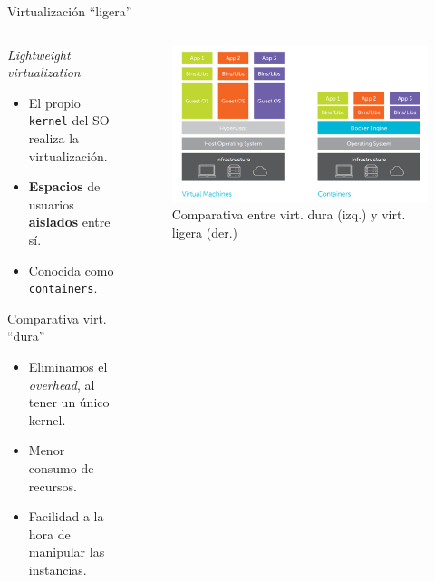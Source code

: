 \documentclass[aspectratio=169,xcolor=dvipsnames]{beamer}
\begin{document}
	\begin{frame}{Virtualización ``ligera''}
	\begin{columns}
	\begin{column}{0.4\textwidth}
	    \begin{block}{\textit{Lightweight virtualization}}
	        \begin{itemize}
	            \item El propio \texttt{kernel} del SO realiza la virtualización.
	            \item \textbf{Espacios} de usuarios \textbf{aislados} entre sí.
	            \item Conocida como \texttt{containers}.
	        \end{itemize}
	    \end{block}
	    
	    \begin{exampleblock}{Comparativa virt. ``dura''}
	        \begin{itemize}
	            \item Eliminamos el \textit{overhead}, al tener un único kernel.
	            \item Menor consumo de recursos.
	            \item Facilidad a la hora de manipular las instancias.
	        \end{itemize}
	    \end{exampleblock}
	\end{column}
	
	\begin{column}{0.6\textwidth}
	    \begin{figure}
            \includegraphics[width=1\textwidth]{img/virtualization_comparative_2.png}
            \caption{Comparativa entre virt. dura (izq.) y virt. ligera (der.)}
       \end{figure}
	\end{column}
	
	\end{columns}
	\end{frame}
	
\end{document}
